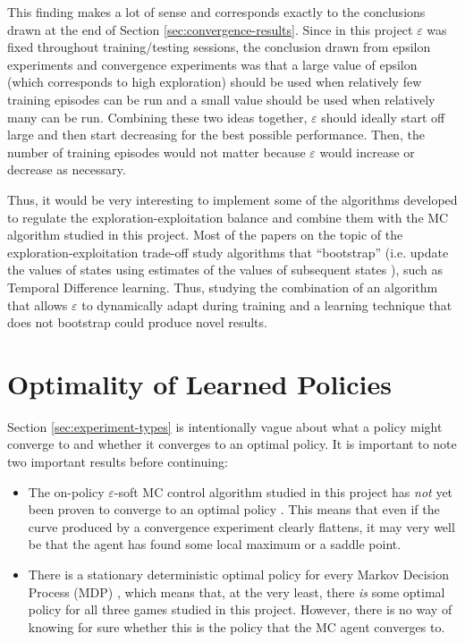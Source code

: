 \documentclass[11pt,a4paper,twoside,openright]{report}
\begin{document}
This finding makes a lot of sense and corresponds exactly to the conclusions drawn at the end of Section \ref{sec:convergence-results}. Since in this project $\varepsilon$ was fixed throughout training/testing sessions, the conclusion drawn from epsilon experiments and convergence experiments was that a large value of epsilon (which corresponds to high exploration) should be used when relatively few training episodes can be run and a small value should be used when relatively many can be run. Combining these two ideas together, $\varepsilon$ should ideally start off large and then start decreasing for the best possible performance. Then, the number of training episodes would not matter because $\varepsilon$ would increase or decrease as necessary.

Thus, it would be very interesting to implement some of the algorithms developed to regulate the exploration-exploitation balance and combine them with the MC algorithm studied in this project. Most of the papers on the topic of the exploration-exploitation trade-off study algorithms that ``bootstrap'' (i.e. update the values of states using estimates of the values of subsequent states \cite{rl-book}), such as Temporal Difference learning. Thus, studying the combination of an algorithm that allows $\varepsilon$ to dynamically adapt during training and a learning technique that does not bootstrap could produce novel results.


\section{Optimality of Learned Policies}
\label{sec:policy-optimality}

Section \ref{sec:experiment-types} is intentionally vague about what a policy might converge to and whether it converges to an optimal policy. It is important to note two important results before continuing:

\begin{itemize}
    \item The on-policy $\varepsilon$-soft MC control algorithm studied in this project has \emph{not} yet been proven to converge to an optimal policy \cite{open-rl-questions}. This means that even if the curve produced by a convergence experiment clearly flattens, it may very well be that the agent has found some local maximum or a saddle point.
    \item There is a stationary deterministic optimal policy for every Markov Decision Process (MDP) \cite{mdp-convergence}, which means that, at the very least, there \emph{is} some optimal policy for all three games studied in this project. However, there is no way of knowing for sure whether this is the policy that the MC agent converges to.
\end{itemize}
\end{document}
